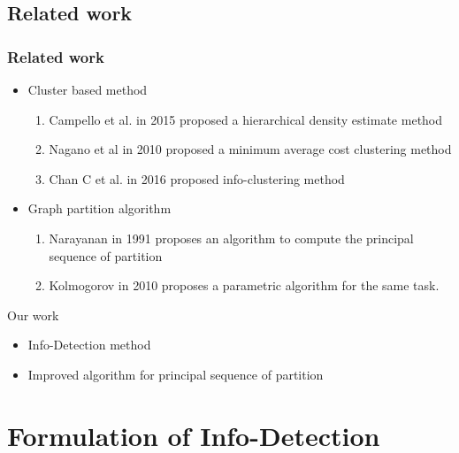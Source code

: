 \documentclass[notheorems]{beamer}
\begin{document}
\subsection{Related work}
\begin{frame}
	\frametitle{Related work}
\begin{itemize}
\item Cluster based method
	\begin{enumerate}
		\item Campello et al. in 2015 proposed a hierarchical density estimate method
		\item Nagano et al in 2010 proposed a minimum average cost clustering method
		\item Chan C et al. in 2016 proposed info-clustering method
	\end{enumerate}
\item Graph partition algorithm
\begin{enumerate}
\item Narayanan in 1991 proposes an algorithm to compute the principal sequence of partition
\item Kolmogorov in 2010 proposes a parametric algorithm for the same task.
\end{enumerate}
\end{itemize}
Our work
\begin{itemize}
\item Info-Detection method
\item Improved algorithm for principal sequence of partition
\end{itemize}
\end{frame}
\section{Formulation of Info-Detection}
\end{document}
